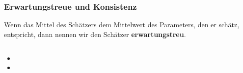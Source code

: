 \documentclass{article}
\begin{document}
\subsubsection{Erwartungstreue und Konsistenz}
Wenn das Mittel des Schätzers dem Mittelwert des Parameters, den er schätz, entspricht, dann nennen wir den Schätzer \textbf{ erwartungstreu}.





\subsection{}
\begin{itemize}
\item
\item
\end{itemize}
\end{document}
